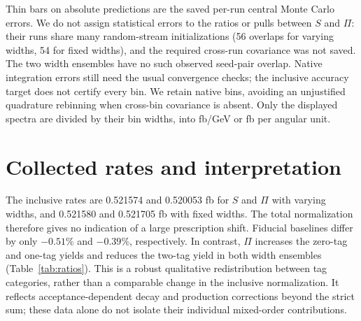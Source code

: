 \documentclass[11pt,a4paper]{article}
\begin{document}
Thin bars on absolute predictions are the saved per-run central Monte
Carlo errors. We do not assign statistical errors to the ratios or pulls
between $S$ and $\Pi$: their runs share many random-stream initializations
(56 overlaps for varying widths, 54 for fixed widths), and the required
cross-run covariance was not saved. The two width ensembles have no such
observed seed-pair overlap. Native integration errors still need the usual
convergence checks; the inclusive accuracy target does not certify every
bin. We retain native bins, avoiding an unjustified quadrature rebinning
when cross-bin covariance is absent. Only the displayed spectra are divided
by their bin widths, into fb/GeV or fb per angular unit.

\section{Collected rates and interpretation}
\begin{table}[htbp]\centering\small
\resizebox{\linewidth}{!}{}
\caption{Central cross sections in fb. The quoted errors are the individual
Monte Carlo integration errors, not scale uncertainties. The baseline is
the common lepton/isolation selection before the exclusive accepted-tag
partition. Fixed and varying widths have identical central definitions.}
\label{tab:rates}
\end{table}

The inclusive rates are 0.521574 and 0.520053 fb for $S$ and $\Pi$ with
varying widths, and 0.521580 and 0.521705 fb with fixed widths. The total
normalization therefore gives no indication of a large prescription
shift. Fiducial baselines differ by only $-0.51$\% and $-0.39$\%,
respectively. In contrast, $\Pi$ increases the zero-tag and one-tag yields
and reduces the two-tag yield in both width ensembles
(Table~\ref{tab:ratios}). This is a robust qualitative redistribution
between tag categories, rather than a comparable change in the inclusive
normalization. It reflects acceptance-dependent decay and production
corrections beyond the strict sum; these data alone do not isolate their
individual mixed-order contributions.

\begin{table}[htbp]\centering\small
\resizebox{\linewidth}{!}{}
\caption{Central percentage shifts and scale-matched ratio envelopes.
The first row of each width block is $100(\Pi/S-1)$ in percent; subsequent
rows are dimensionless ratio ranges. These bands retain the specified
common nuisance vector between approximations. No cross-run Monte Carlo
error or statistical significance is inferred.}
\label{tab:ratios}
\end{table}
\end{document}
